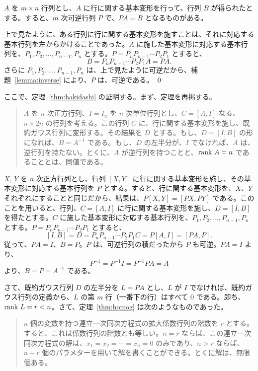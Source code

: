 \begin{lemma} \label{lemma:elemP}
$A$ を $m\times n$ 行列とし、$A$ に行に関する基本変形を行って、行列 $B$ が得られたとする。すると、$m$ 次可逆行列 $P$ で、$PA = B$ となるものがある。
\end{lemma}
\proof
上で見たように、ある行列に行に関する基本変形を施すことは、それに対応する基本行列を左からかけることであった。$A$ に施した基本変形に対応する基本行列を、$P_1, P_2, \ldots, P_{n-1}, P_n$ とする。$P = P_nP_{n-1}\cdots P_2P_1$ とすると、
$$B = P_nP_{n-1}\cdots P_2P_1A = PA.$$
さらに $P_1, P_2, \ldots, P_{n-1}, P_n$ は、上で見たように可逆だから、補題~\ref{lemma:inverse} により、$P$ は、可逆である。
\qed

\medskip
ここで、定理~\ref{thm:hakidashi} の証明する。まず、定理を再掲する。

\begin{quote}
$A$ を $n$ 次正方行列、$I = I_n$ を $n$ 次単位行列とし、$C = [A, I]$ なる、$n\times 2n$ の行列を考える。この行列 $C$ に、行に関する基本変形を施し、既約ガウス行列に変形する。その結果を  $D$ とする。もし、$D = [I, B]$ の形になれば、$B = A^{-1}$ である。もし、$D$ の左半分が、$I$ でなければ、$A$ は、逆行列を持たない。とくに、$A$ が逆行列を持つことと、$\mbox{{\rm rank }} A = n$ であることとは、同値である。
\end{quote}

$X$, $Y$ を $n$ 次正方行列とし、行列 $[X, Y]$ に行に関する基本変形を施し、その基本変形に対応する基本行列を $P$ とする。すると、行に関する基本変形を、$X$、$Y$ それぞれにすることと同じだから、結果は、$P[X, Y] = [PX, PY]$ である。このことを用いると、行列、$C = [A, I]$ に行に関する基本変形を施し、$D = [I, B]$  を得たとする。$C$ に施した基本変形に対応する基本行列を、$P_1, P_2, \ldots, P_{n-1}, P_n$ とする。$P = P_nP_{n-1}\cdots P_2P_1$ とすると、
$$[I, B] = D = P_nP_{n-1}\cdots P_2P_1C = P[A, I] = [PA, P].$$
従って、$PA = I$、$B = P$。$P$ は、可逆行列の積だったから $P$ も可逆。$PA = I$ より、
$$P^{-1} = P^{-1}I = P^{-1}PA = A$$
より、$B = P = A^{-1}$ である。

さて、既約ガウス行列 $D$ の左半分を $L = PA$ とし、$L$ が $I$ でなければ、既約ガウス行列の定義から、$L$ の第 $m$ 行（一番下の行）はすべて $0$ である。即ち、$\mbox{{\rm rank }} L = r < n$。さて、定理~\ref{thm:homog} は次のようなものであった。

\begin{quote}
$n$  個の変数を持つ連立一次同次方程式の拡大係数行列の階数を $r$ とする。すると、これは係数行列の階数とも等しい。$n=r$ ならば、この連立一次同次方程式の解は、$x_1 = x_2 = \cdots = x_n = 0$ のみであり、$n>r$ ならば、$n-r$ 個のパラメターを用いて解を書くことができる。とくに解は、無限個ある。
\end{quote}

